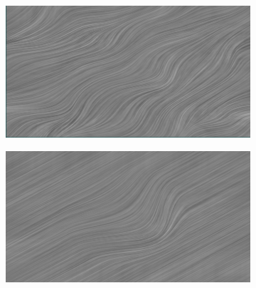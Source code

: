 \begin{figure}
	\centering	
	\begin{subfigure}{0.45\textwidth}
		\includegraphics[height=\textwidth,width=\textwidth]{figures/mylic.png}
	\end{subfigure}
	\hfill
	\begin{subfigure}{0.45\textwidth}
		\includegraphics[height=\textwidth,width=\textwidth]{figures/mylic2.png}

\end{subfigure}
\end{figure}
